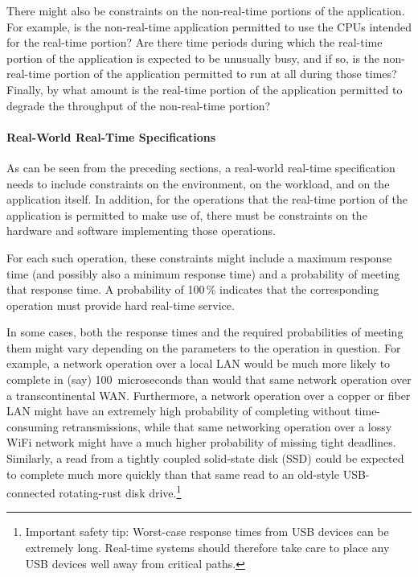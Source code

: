 There might also be constraints on the non-real-time portions of the
application.
For example, is the non-real-time application permitted to use the CPUs
intended for the real-time portion?
Are there time periods during which the real-time portion of the application
is expected to be unusually busy, and if so, is the non-real-time portion
of the application permitted to run at all during those times?
Finally, by what amount is the real-time portion of the application permitted
to degrade the throughput of the non-real-time portion?

\paragraph{Real-World Real-Time Specifications}
\label{sec:advsync:Real-World Real-Time Specifications}

As can be seen from the preceding sections, a real-world real-time
specification needs to include constraints on the environment,
on the workload, and on the application itself.
In addition, for the operations that the real-time portion of the
application is permitted to make use of, there must be constraints
on the hardware and software implementing those operations.

For each such operation, these constraints might include a maximum
response time (and possibly also a minimum response time) and a
probability of meeting that response time.
A probability of 100\,\% indicates that the corresponding operation
must provide hard real-time service.

In some cases, both the response times and the required probabilities of
meeting them might vary depending on the parameters to the operation in
question.
For example, a network operation over a local LAN would be much more likely
to complete in (say) 100~microseconds than would that same network operation
over a transcontinental WAN\@.
Furthermore, a network operation over a copper or fiber
LAN might have an extremely
high probability of completing without time-consuming retransmissions,
while that same networking operation over a lossy WiFi network might
have a much higher probability of missing tight deadlines.
Similarly, a read from a tightly coupled solid-state disk (SSD) could be
expected to complete much more quickly than that same read to an old-style
USB-connected rotating-rust disk drive.\footnote{
	Important safety tip:  Worst-case response times from USB devices
	can be extremely long.
	Real-time systems should therefore take care to place any USB
	devices well away from critical paths.}


